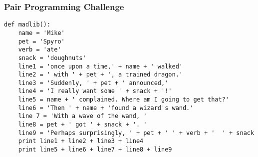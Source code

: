 \begin{frame}[fragile]
	\frametitle{Pair Programming Challenge}
	
	\begin{lstlisting}
def madlib():
	name = 'Mike'
	pet = 'Spyro'
	verb = 'ate'
	snack = 'doughnuts'
	line1 = 'once upon a time,' + name + ' walked'
	line2 = ' with ' + pet + ', a trained dragon.'
	line3 = 'Suddenly, ' + pet + ' announced,'
	line4 = 'I really want some ' + snack + '!'
	line5 = name + ' complained. Where am I going to get that?'
	line6 = 'Then ' + name + 'found a wizard's wand.'
	line 7 = 'With a wave of the wand, '
	line8 = pet + ' got ' + snack + '. '
	line9 = 'Perhaps surprisingly, ' + pet + ' ' + verb + '  ' + snack
	print line1 + line2 + line3 + line4
	print line5 + line6 + line7 + line8 + line9

\end{lstlisting}
	
\end{frame}


